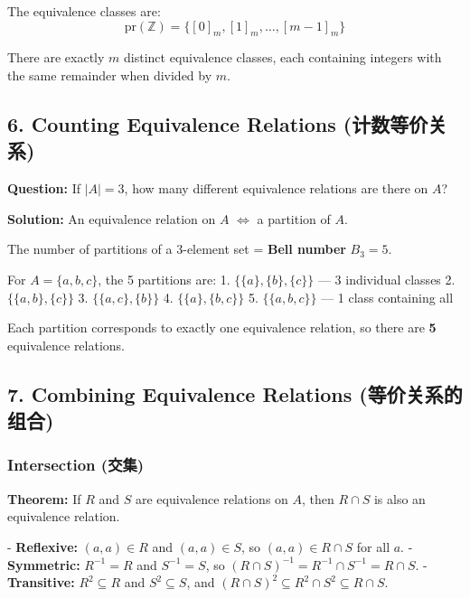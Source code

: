 \documentclass[10pt,a4paper,openany]{ctexbook}
\theoremstyle{definition}
\theoremstyle{remark}
\renewenvironment{quote}
  {\list{}{\leftmargin=1em\rightmargin=0pt\topsep=0.5pt\partopsep=0pt}\item[]}
  {\endlist}
\begin{document}
The equivalence classes are:
\[
\text{pr}(\mathbb{Z}) = \{[0]_m, [1]_m, \dots, [m-1]_m\}
\]

There are exactly $m$ distinct equivalence classes, each containing integers with the same remainder when divided by $m$.
\vspace{-2pt}

\subsection{6. Counting Equivalence Relations (计数等价关系)}

\begin{quote}
\textbf{Question:} If $|A| = 3$, how many different equivalence relations are there on $A$?

\textbf{Solution:} An equivalence relation on $A$ $\Longleftrightarrow$ a partition of $A$.

The number of partitions of a 3-element set = \textbf{Bell number} $B_3 = 5$.

For $A = \{a,b,c\}$, the 5 partitions are:
1. $\{\{a\}, \{b\}, \{c\}\}$ — 3 individual classes
2. $\{\{a,b\}, \{c\}\}$
3. $\{\{a,c\}, \{b\}\}$
4. $\{\{a\}, \{b,c\}\}$
5. $\{\{a,b,c\}\}$ — 1 class containing all

Each partition corresponds to exactly one equivalence relation, so there are \textbf{5} equivalence relations.

\end{quote}
\vspace{-2pt}

\subsection{7. Combining Equivalence Relations (等价关系的组合)}

\subsubsection{Intersection (交集)}

\begin{quote}
\textbf{Theorem:} If $R$ and $S$ are equivalence relations on $A$, then $R \cap S$ is also an equivalence relation.

- \textbf{Reflexive:} $(a,a) \in R$ and $(a,a) \in S$, so $(a,a) \in R \cap S$ for all $a$.
- \textbf{Symmetric:} $R^{-1} = R$ and $S^{-1} = S$, so $(R \cap S)^{-1} = R^{-1} \cap S^{-1} = R \cap S$.
- \textbf{Transitive:} $R^2 \subseteq R$ and $S^2 \subseteq S$, and $(R \cap S)^2 \subseteq R^2 \cap S^2 \subseteq R \cap S$.

\end{quote}
\end{document}
